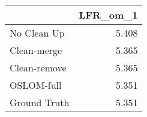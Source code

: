 \begin{tabular}{lr}
\toprule
{} & LFR_om_1 \\
\midrule
No Clean Up  &    5.408 \\
Clean-merge  &    5.365 \\
Clean-remove &    5.365 \\
OSLOM-full   &    5.351 \\
Ground Truth &    5.351 \\
\bottomrule
\end{tabular}
